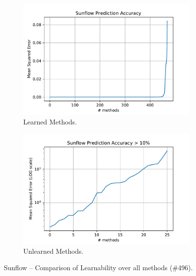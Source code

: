 
\begin{figure}[h]
	\centering
	\begin{subfigure}{.5\textwidth}
	  \centering
	  \includegraphics[width=.99\linewidth]{images/Sunflow_plt_learnable_func_all_model_mse}
	  \caption{Learned Methods.}
	  \label{fig:sunflow_model_mse_lern}
	\end{subfigure}%
	\begin{subfigure}{.5\textwidth}
	  \centering
	  \includegraphics[width=.99\linewidth]{images/Sunflow_plt_unlearnable_func_all_model_mse_log}
	  \caption{Unlearned Methods.}
	  \label{fig:sunflow_model_mse_unlern}
	\end{subfigure}
	\caption{Sunflow -- Comparison of Learnability over all methods (\#496).}
	\label{fig:s_lernability_all_methods}
\end{figure}

